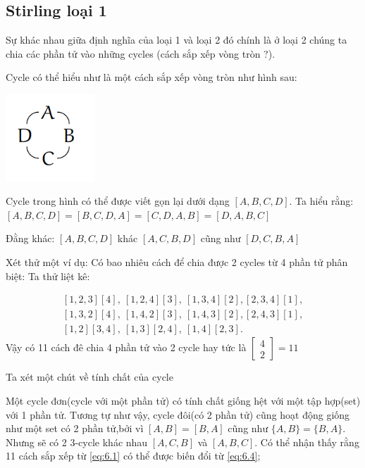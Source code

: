 \subsection{Stirling loại 1}
Sự khác nhau giữa định nghĩa của loại 1 và loại 2 đó chính là
ở loại 2 chúng ta chia các phần tử vào những cycles (cách sắp xếp vòng tròn ?). 

Cycle có thể hiểu như là một cách sắp xếp vòng tròn như hình sau:

\includegraphics[width=0.25\textwidth]{assets/chapter6/cycle.png}

Cycle trong hình có thể được viết gọn lại dưới dạng $[A,B,C,D]$.
Ta hiểu rằng:
$[A,B,C,D] = [B,C,D,A] = [C,D,A,B] = [D,A,B,C]$

Đằng khác:
$[A,B,C,D]$ khác $[A,C,B,D]$ cũng như $[D,C,B,A]$

Xét thử một ví dụ: Có bao nhiêu cách để chia được 2 cycles từ 4 phần tử phân biệt:
Ta thử liệt kê: 

\begin{equation}
    \begin{aligned}
        [1,2,3][4], \ [1,2,4][3], \ [1,3,4][2], [2,3,4][1], \\
        [1,3,2][4], \ [1,4,2][3], \ [1,4,3][2], [2,4,3][1], \\
        [1,2][3,4], \ [1,3][2,4], \ [1,4][2,3].
    \end{aligned} \label{eq:6.4}
\end{equation}
Vậy có 11 cách đê chia 4 phần tử vào 2 cycle hay tức là $\begin{bmatrix} 4 \\ 2  \end{bmatrix} = 11$


Ta xét một chút về tính chất của cycle

Một cycle đơn(cycle với một phần tử) có tính chất giống hệt với một tập hợp(set) với 1 phần tử.
Tương tự như vậy, cycle đôi(có 2 phần tử) cũng hoạt động giống như một set có 2 phần tử,bởi vì 
$[A,B] = [B,A]$ cũng như $\{A,B\} = \{B,A\}$. Nhưng sẽ có 2 3-cycle khác nhau $[A,C,B]$ và $[A,B,C]$.
Có thể nhận thấy rằng 11 cách sắp xếp từ \eqref{eq:6.1} có thể được biến đổi từ \eqref{eq:6.4}; 

